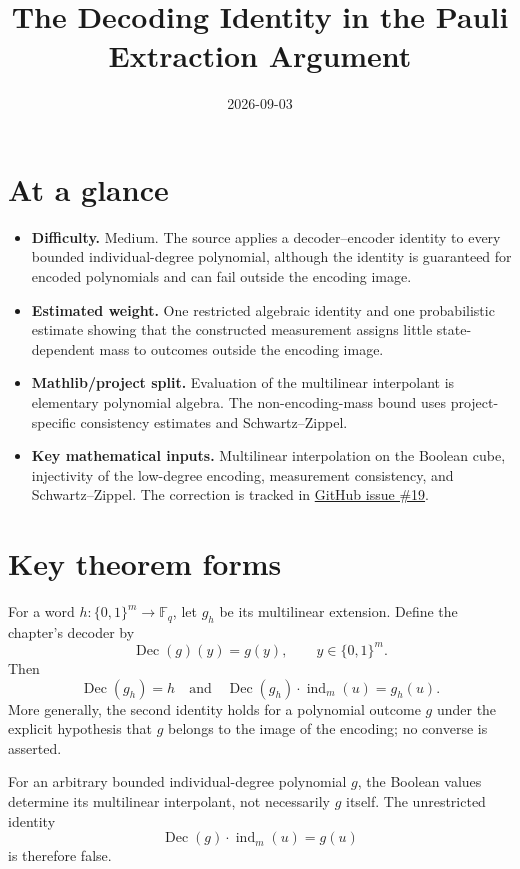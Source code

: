 \documentclass[11pt]{article}
\title{The Decoding Identity in the Pauli Extraction Argument}
\author{}
\date{2026-09-03}
\renewcommand{\ghissue}[1]{%
  \href{https://github.com/Dengnifer/MIPStarRE-A/issues/#1}{GitHub issue \##1}}
\begin{document}
\maketitle

\section{At a glance}

\begin{itemize}
  \item \textbf{Difficulty.} Medium.  The source applies a decoder--encoder
  identity to every bounded individual-degree polynomial, although the identity
  is guaranteed for encoded polynomials and can fail outside the encoding image.
  \item \textbf{Estimated weight.} One restricted algebraic identity and one
  probabilistic estimate showing that the constructed measurement assigns
  little state-dependent mass to outcomes outside the encoding image.
  \item \textbf{Mathlib/project split.} Evaluation of the multilinear
  interpolant is elementary polynomial algebra.  The non-encoding-mass bound
  uses project-specific consistency estimates and Schwartz--Zippel.
  \item \textbf{Key mathematical inputs.} Multilinear interpolation on the
  Boolean cube, injectivity of the low-degree encoding, measurement
  consistency, and Schwartz--Zippel.  The correction is tracked in
  \ghissue{19}.
\end{itemize}

\section{Key theorem forms}

For a word $h\colon\{0,1\}^m\to\mathbb F_q$, let $g_h$ be its multilinear
extension.  Define the chapter's decoder by
\[
  \operatorname{Dec}(g)(y)=g(y),
  \qquad y\in\{0,1\}^m.
\]
Then
\[
  \operatorname{Dec}(g_h)=h
  \quad\text{and}\quad
  \operatorname{Dec}(g_h)\mathbin{\cdot}\operatorname{ind}_m(u)=g_h(u).
\]
More generally, the second identity holds for a polynomial outcome $g$ under
the explicit hypothesis that $g$ belongs to the image of the encoding; no
converse is asserted.

For an arbitrary bounded individual-degree polynomial $g$, the Boolean values
determine its multilinear interpolant, not necessarily $g$ itself.  The
unrestricted identity
\[
  \operatorname{Dec}(g)\mathbin{\cdot}\operatorname{ind}_m(u)=g(u)
\]
is therefore false.
\end{document}
